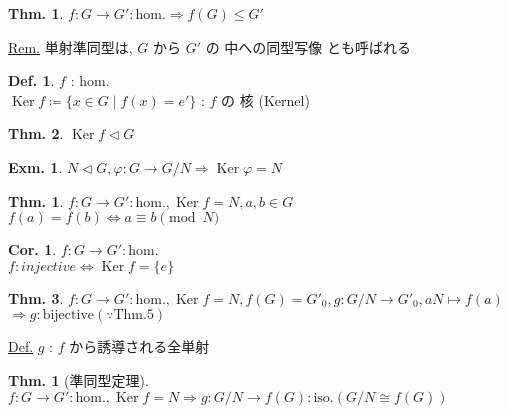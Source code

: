 \documentclass[uplatex,dvipdfmx,9pt]{beamer}
\newcommand{\nsubgroup}{\vartriangleleft} %
\newcommand{\Ker}{\operatorname{Ker}}
\newcounter{textThmCount}
\newcounter{textExmCount}
\theoremstyle{definition} %
\newtheorem{defn}{Def.}[subsection] %
\newtheorem{thm}{Thm.}[subsection] %
\newtheorem{thmText}[textThmCount]{Thm.}
\newtheorem{corText}{Cor.}[textThmCount] %
\theoremstyle{example}
\newtheorem{exmText}[textExmCount]{Exm.}
\begin{document}
      \begin{frame}
        
        \begin{thm}
          $f\colon G \to G' : \text{hom.} \Rightarrow f(G) \le G'$
        \end{thm}
        \underline{Rem.} 単射準同型は, $G$ から $G'$ の \alert{中への同型写像} とも呼ばれる

        \begin{defn}
          $f$ : hom. \\
          $\Ker f \coloneqq \{x \in G \mid f(x) = e'\}$ : $f$ の \alert{核} (Kernel)
        \end{defn}

        \begin{thm}
          $\Ker f \nsubgroup G$
        \end{thm}

        \begin{exmText}
          $N \nsubgroup G, \varphi: G \to G/N \Rightarrow \Ker \varphi = N$
        \end{exmText}

      \end{frame}

      \begin{frame}
        
        \begin{thmText}
          $f\colon G \to G' : \text{hom.}, \Ker f = N, a,b \in G$ \\
          $f(a) = f(b) \Leftrightarrow a \equiv b \pmod{N}$
        \end{thmText}

        \begin{corText}
          $f\colon G \to G': \text{hom.} $ \\
          $f\colon injective \Leftrightarrow \Ker f = \{e\}$
        \end{corText}

        \begin{thm}
          $f\colon G \to G' : \text{hom.}, \Ker f = N, f(G) = G'_0, g\colon G/N \to G'_0, aN \mapsto f(a)$ \\
          $\Rightarrow g: \text{bijective} (\because \text{Thm.5})$
        \end{thm}
        \underline{Def.} $g$ : \alert{$f$ から誘導される全単射}


        \begin{thmText}[準同型定理]
          $f\colon G \to G' : \text{hom.}, \Ker f = N \Rightarrow g\colon G/N \to f(G): \text{iso.} (G/N \cong f(G))$
        \end{thmText}

      \end{frame}
\end{document}
